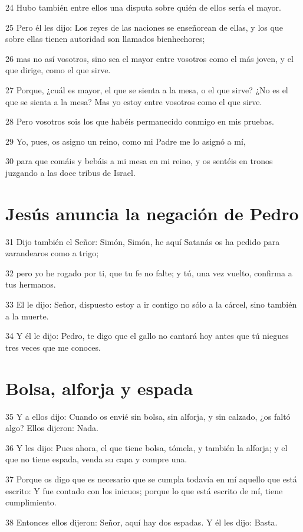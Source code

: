 \par 24 Hubo también entre ellos una disputa sobre quién de ellos sería el mayor.
\par 25 Pero él les dijo: Los reyes de las naciones se enseñorean de ellas, y los que sobre ellas tienen autoridad son llamados bienhechores;
\par 26 mas no así vosotros, sino sea el mayor entre vosotros como el más joven, y el que dirige, como el que sirve.
\par 27 Porque, ¿cuál es mayor, el que se sienta a la mesa, o el que sirve? ¿No es el que se sienta a la mesa? Mas yo estoy entre vosotros como el que sirve.
\par 28 Pero vosotros sois los que habéis permanecido conmigo en mis pruebas.
\par 29 Yo, pues, os asigno un reino, como mi Padre me lo asignó a mí,
\par 30 para que comáis y bebáis a mi mesa en mi reino, y os sentéis en tronos juzgando a las doce tribus de Israel.

\section*{Jesús anuncia la negación de Pedro}

\par 31 Dijo también el Señor: Simón, Simón, he aquí Satanás os ha pedido para zarandearos como a trigo;
\par 32 pero yo he rogado por ti, que tu fe no falte; y tú, una vez vuelto, confirma a tus hermanos.
\par 33 El le dijo: Señor, dispuesto estoy a ir contigo no sólo a la cárcel, sino también a la muerte.
\par 34 Y él le dijo: Pedro, te digo que el gallo no cantará hoy antes que tú niegues tres veces que me conoces.

\section*{Bolsa, alforja y espada}

\par 35 Y a ellos dijo: Cuando os envié sin bolsa, sin alforja, y sin calzado, ¿os faltó algo? Ellos dijeron: Nada.
\par 36 Y les dijo: Pues ahora, el que tiene bolsa, tómela, y también la alforja; y el que no tiene espada, venda su capa y compre una.
\par 37 Porque os digo que es necesario que se cumpla todavía en mí aquello que está escrito: Y fue contado con los inicuos; porque lo que está escrito de mí, tiene cumplimiento.
\par 38 Entonces ellos dijeron: Señor, aquí hay dos espadas. Y él les dijo: Basta.


